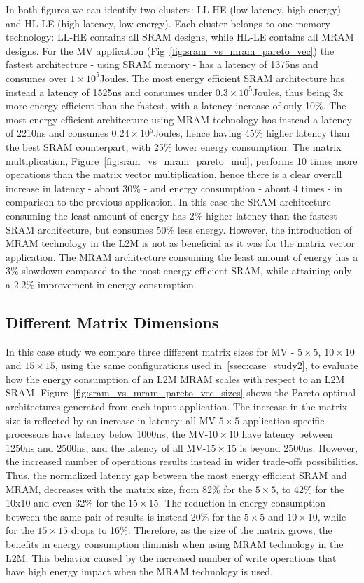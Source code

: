 In both figures we can identify two clusters: LL-HE (low-latency, high-energy) and HL-LE (high-latency, low-energy). Each cluster belongs to one memory technology: LL-HE contains all SRAM designs, while HL-LE contains all MRAM designs.
For the MV application (Fig~\ref{fig:sram_vs_mram_pareto_vec}) the fastest architecture - using SRAM memory - has a latency of 1375ns and consumes over $1\times10^5$Joules. The most energy efficient SRAM architecture has instead a latency of 1525ns and consumes under $0.3\times10^5$Joules, thus being 3x more energy efficient than the fastest, with a latency increase of only 10\%. The most energy efficient architecture using MRAM technology has instead a latency of 2210ns and consumes $0.24\times10^5$Joules, hence having 45\% higher latency than the best SRAM counterpart, with 25\% lower energy consumption. The matrix multiplication, Figure~\ref{fig:sram_vs_mram_pareto_mul}, performs 10 times more operations than the matrix vector multiplication, hence there is a clear overall increase in latency - about 30\% - and energy consumption - about 4 times -  in comparison to the previous application. In this case the SRAM architecture consuming the least amount of energy has 2\% higher latency than the fastest SRAM architecture, but consumes 50\% less energy. However, the introduction of MRAM technology in the L2M is not as beneficial as it was for the matrix vector application. The MRAM architecture consuming the least amount of energy has a 3\% slowdown compared to the most energy efficient SRAM, while attaining only a 2.2\% improvement in energy consumption.


\subsection{Different Matrix Dimensions}
\label{ssec:case_study3}
In this case study we compare three different matrix sizes for MV - $5\times5$, $10\times10$ and $15\times15$, using the same configurations used in~\ref{ssec:case_study2}, to evaluate how the energy consumption of an L2M MRAM scales with respect to an L2M SRAM. Figure~\ref{fig:sram_vs_mram_pareto_vec_sizes} shows the Pareto-optimal architectures generated from each input application. The increase in the matrix size is reflected by an increase in latency: all MV-$5\times5$ application-specific processors have latency below 1000ns, the MV-$10\times10$ have latency between 1250ns and 2500ns, and the latency of all MV-$15\times15$ is beyond 2500ns.
However, the increased number of operations results instead in wider trade-offs possibilities. Thus, the normalized latency gap between the most energy efficient SRAM and MRAM, decreases with the matrix size, from 82\% for the $5\times5$, to 42\% for the 10x10 and even 32\% for the $15\times15$. The reduction in energy consumption between the same pair of results is instead 20\% for the $5\times5$ and $10\times10$, while for the $15\times15$ drops to 16\%. Therefore, as the size of the matrix grows, the benefits in energy consumption diminish when using MRAM technology in the L2M. This behavior caused by the increased number of write operations that have high energy impact when the MRAM technology is used.



